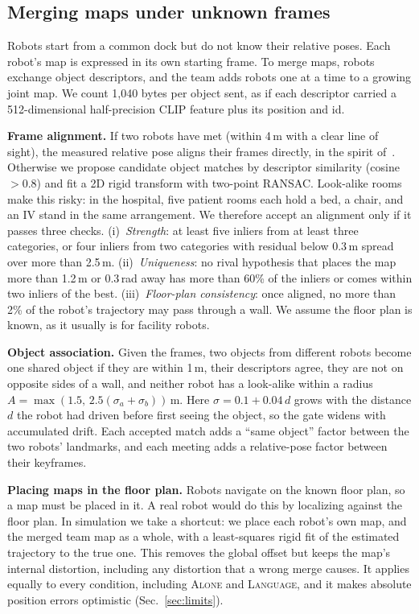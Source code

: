 \documentclass[conference]{IEEEtran}
\newcommand{\cond}[1]{\textsc{#1}}
\begin{document}
\subsection{Merging maps under unknown frames}\label{sec:merge}
Robots start from a common dock but do not know their relative poses.
Each robot's map is expressed in its own starting frame.
To merge maps, robots exchange object descriptors, and the team adds robots one at a time to a growing joint map.
We count 1{,}040 bytes per object sent, as if each descriptor carried a 512-dimensional half-precision CLIP feature plus its position and id.

\textbf{Frame alignment.}
If two robots have met (within 4\,m with a clear line of sight), the measured relative pose aligns their frames directly, in the spirit of~\cite{zhou2006rendezvous,howard2006ijrr}.
Otherwise we propose candidate object matches by descriptor similarity (cosine $>0.8$) and fit a 2D rigid transform with two-point RANSAC.
Look-alike rooms make this risky: in the hospital, five patient rooms each hold a bed, a chair, and an IV stand in the same arrangement.
We therefore accept an alignment only if it passes three checks.
(i)~\emph{Strength}: at least five inliers from at least three categories, or four inliers from two categories with residual below 0.3\,m spread over more than 2.5\,m.
(ii)~\emph{Uniqueness}: no rival hypothesis that places the map more than 1.2\,m or 0.3\,rad away has more than 60\% of the inliers or comes within two inliers of the best.
(iii)~\emph{Floor-plan consistency}: once aligned, no more than 2\% of the robot's trajectory may pass through a wall.
We assume the floor plan is known, as it usually is for facility robots.

\textbf{Object association.}
Given the frames, two objects from different robots become one shared object if they are within 1\,m, their descriptors agree, they are not on opposite sides of a wall, and neither robot has a look-alike within a radius $A=\max(1.5,\,2.5(\sigma_a+\sigma_b))$\,m.
Here $\sigma = 0.1 + 0.04\,d$ grows with the distance $d$ the robot had driven before first seeing the object, so the gate widens with accumulated drift.
Each accepted match adds a ``same object'' factor between the two robots' landmarks, and each meeting adds a relative-pose factor between their keyframes.

\textbf{Placing maps in the floor plan.}
Robots navigate on the known floor plan, so a map must be placed in it.
A real robot would do this by localizing against the floor plan.
In simulation we take a shortcut: we place each robot's own map, and the merged team map as a whole, with a least-squares rigid fit of the estimated trajectory to the true one.
This removes the global offset but keeps the map's internal distortion, including any distortion that a wrong merge causes.
It applies equally to every condition, including \cond{Alone} and \cond{Language}, and it makes absolute position errors optimistic (Sec.~\ref{sec:limits}).
\end{document}
